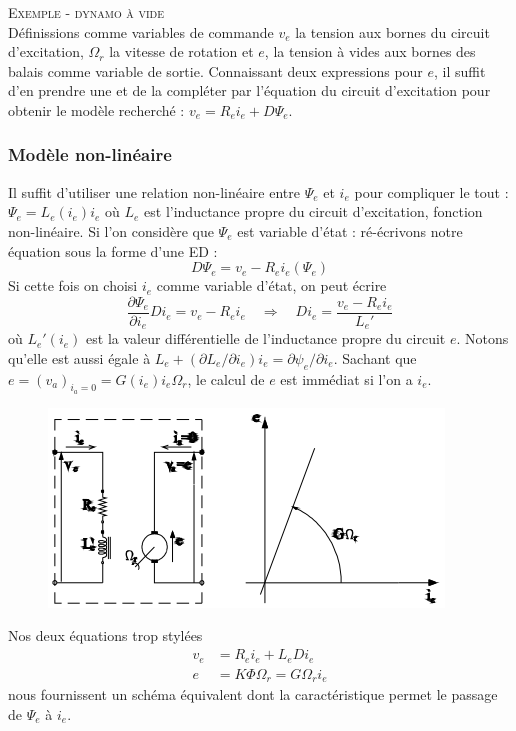 	\textsc{Exemple - dynamo à vide}\\
	Définissions comme variables de commande $v_e$ la tension aux bornes 
	du circuit d'excitation, $\Omega_r$ la vitesse de rotation et $e$, 
	la tension à vides aux bornes des balais comme variable de sortie. 
	Connaissant deux expressions pour $e$, il suffit d'en prendre une et 
	de la compléter par l'équation du circuit d'excitation pour obtenir le 
	modèle recherché : $v_e = R_ei_e +D\Psi_e$.
	
		\subsubsection{Modèle non-linéaire}
		Il suffit d'utiliser une relation non-linéaire entre $\Psi_e$ 
		et $i_e$ pour compliquer le tout : $\Psi_e = L_e(i_e)i_e$ où 
		$L_e$ est l'inductance propre du circuit d'excitation, fonction 
		non-linéaire. Si l'on considère que $\Psi_e$ est variable d'état :
		ré-écrivons notre équation sous la forme d'une ED :
		\begin{equation}
		D\Psi_e = v_e-R_ei_e(\Psi_e)
		\end{equation}
		Si cette fois on choisi $i_e$ comme variable d'état, on peut 
		écrire
		\begin{equation}
		\dfrac{\partial \Psi_e}{\partial i_e}Di_e = v_e-R_ei_e\quad 
		\Longrightarrow\quad Di_e = \dfrac{v_e - R_ei_e}{L_e'}
		\end{equation}
		où $L_e'(i_e)$ est la valeur différentielle de l'inductance 
		propre du circuit $e$. Notons qu'elle est aussi égale à 
		$L_e+(\partial L_e/\partial i_e)i_e = \partial\psi_e/\partial 
		i_e$. Sachant que $e = (v_a)_{i_a=0} = G(i_e)i_e\Omega_r$, le 
		calcul de $e$ est immédiat si l'on a $i_e$.\\

		\begin{figure}
		\vspace{-8mm}
		\includegraphics[scale=0.5]{ch4/image9.png}
		\end{figure}
		Nos deux équations trop stylées 
		\begin{equation}
		\begin{array}{ll}
		v_e &= R_ei_e + L_e Di_e\\
		e &= K\Phi\Omega_r = G\Omega_ri_e
		\end{array}
		\end{equation}
		nous fournissent un schéma équivalent dont la caractéristique 
		permet le passage de $\Psi_e$ à $i_e$.
		
